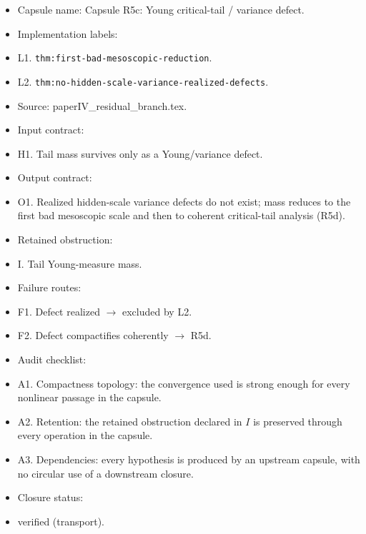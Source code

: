 \documentclass[11pt]{amsart}
\begin{document}
\begin{itemize}
  \item Capsule name: Capsule R5c: Young critical-tail / variance defect.
  \item Implementation labels:
  \item L1. \texttt{thm:first-bad-mesoscopic-reduction}.
  \item L2. \texttt{thm:no-hidden-scale-variance-realized-defects}.
  \item Source: paperIV\_residual\_branch.tex.
  \item Input contract:
  \item H1. Tail mass survives only as a Young/variance defect.
  \item Output contract:
  \item O1. Realized hidden-scale variance defects do not exist; mass reduces to the first bad mesoscopic scale and then to coherent critical-tail analysis (R5d).
  \item Retained obstruction:
  \item I. Tail Young-measure mass.
  \item Failure routes:
  \item F1. Defect realized $\to$ excluded by L2.
  \item F2. Defect compactifies coherently $\to$ R5d.
  \item Audit checklist:
  \item A1. Compactness topology: the convergence used is strong enough for every nonlinear passage in the capsule.
  \item A2. Retention: the retained obstruction declared in $I$ is preserved through every operation in the capsule.
  \item A3. Dependencies: every hypothesis is produced by an upstream capsule, with no circular use of a downstream closure.
  \item Closure status:
  \item verified (transport).
\end{itemize}
\end{document}
